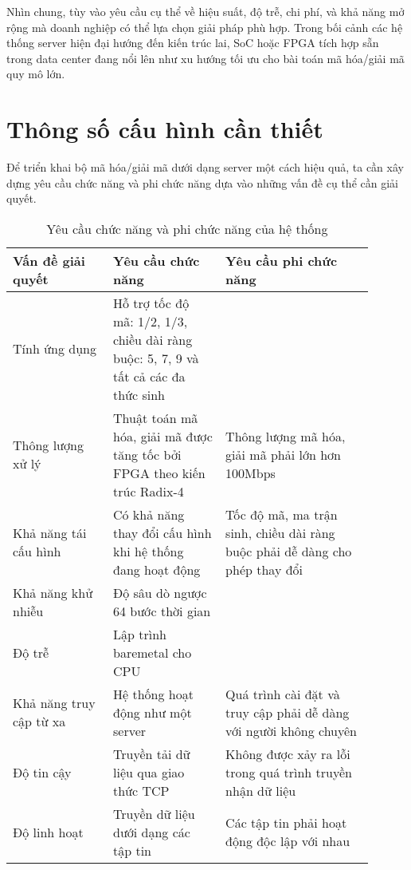 \documentclass[../DoAn.tex]{subfiles}
\begin{document}
Nhìn chung, tùy vào yêu cầu cụ thể về hiệu suất, độ trễ, chi phí, và khả năng mở rộng mà doanh nghiệp có thể lựa chọn giải pháp phù hợp. Trong bối cảnh các hệ thống server hiện đại hướng đến kiến trúc lai, SoC hoặc FPGA tích hợp sẵn trong data center đang nổi lên như xu hướng tối ưu cho bài toán mã hóa/giải mã quy mô lớn.

\newpage
\section{Thông số cấu hình cần thiết }

Để triển khai bộ mã hóa/giải mã dưới dạng server một cách hiệu quả, ta cần xây dựng yêu cầu chức năng và phi chức năng dựa vào những vấn đề cụ thể cần giải quyết.

\begin{table}[H]
\centering{}
    \begin{tabular}{|p{0.25\linewidth} |p{0.28\linewidth} |p{0.37\linewidth}|}
        \hline
        \textbf{Vấn đề giải quyết} & \textbf{Yêu cầu chức năng}  & \textbf{Yêu cầu phi chức năng}\\ \hline\hline
        Tính ứng dụng  & Hỗ trợ tốc độ mã: 1/2, 1/3, chiều dài ràng buộc: 5, 7, 9 và tất cả các đa thức sinh  &    \\ \hline
        Thông lượng xử lý  & Thuật toán mã hóa, giải mã được tăng tốc bởi FPGA theo kiến trúc Radix-4  & Thông lượng mã hóa, giải mã phải lớn hơn 100Mbps   \\ \hline
        Khả năng tái cấu hình  & Có khả năng thay đổi cấu hình khi hệ thống đang hoạt động   & Tốc độ mã, ma trận sinh, chiều dài ràng buộc phải dễ dàng cho phép thay đổi  \\ \hline
        Khả năng khử nhiễu  & Độ sâu dò ngược 64 bước thời gian  &   \\ \hline
        Độ trễ  &  Lập trình baremetal cho CPU  &   \\ \hline
        Khả năng truy cập từ xa   &  Hệ thống hoạt động như một server  &  Quá trình cài đặt và truy cập phải dễ dàng với người không chuyên \\ \hline
        Độ tin cậy  & Truyền tải dữ liệu qua giao thức TCP   & Không được xảy ra lỗi trong quá trình truyền nhận dữ liệu   \\ \hline
        Độ linh hoạt  & Truyền dữ liệu dưới dạng các tập tin  & Các tập tin phải hoạt động độc lập với nhau   \\ \hline
        \end{tabular}
    \caption{Yêu cầu chức năng và phi chức năng của hệ thống}
\end{table}
\end{document}
